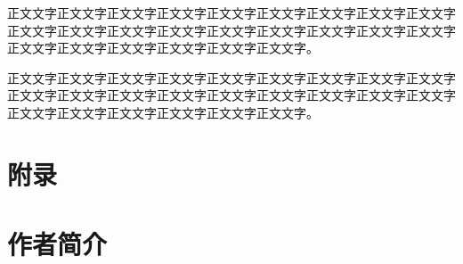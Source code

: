 \documentclass[
	StudentName     = ,
	StudentNameEng	= {{Name of Graduate (such as HAN Bao-cheng)}},
	AdvisorName     = {{姓名 职称}},
        AdvisorNameOut     = {{姓名 职称}},
	AdvisorNameEng	= {{Name of Supervisor and Title (such as Prof. FENG Chang-gen)}},
        AdvisorNameEngOut = {{Name of Second Supervisor and Title}},
	StudentID		= xxxxx,
	Major           = {{电子信息硕士}},
	ResearchInterest= {{计算机技术}},
	Department		= XXXX学院,
	DepartmentEng	= {{Name of Department (or School)}},
	SubmitYear		= 202X,
	SubmitMonth		= X,
	SubmitDay		= XX,
	DefenseYear		= 202X,
	DefenseMonth	= X,
	DefenseDay		= XX,
	DefenseDateEng  = {{Date of Submit (such as April 2002)}},
	Title           = {{基于深度强化学习的多无人机协同控制研究}},
	TitleEng        = {{English Title}},
	CLCNumber		= TD235,
	UDCNumber		= 624.152.5
]{cauc_thesis}
\begin{document}
正文文字正文文字正文文字正文文字正文文字正文文字正文文字正文文字正文文字正文文字正文文字正文文字正文文字正文文字正文文字正文文字正文文字正文文字正文文字正文文字正文文字正文文字正文文字正文文字。

正文文字正文文字正文文字正文文字正文文字正文文字正文文字正文文字正文文字正文文字正文文字正文文字正文文字正文文字正文文字正文文字正文文字正文文字正文文字正文文字正文文字正文文字正文文字正文文字。


\nocite{*}%
{\centering 
	
	}

{\centering \chapter *{附\qquad 录}}



{\centering \chapter*{作者简介}}
\end{document}
